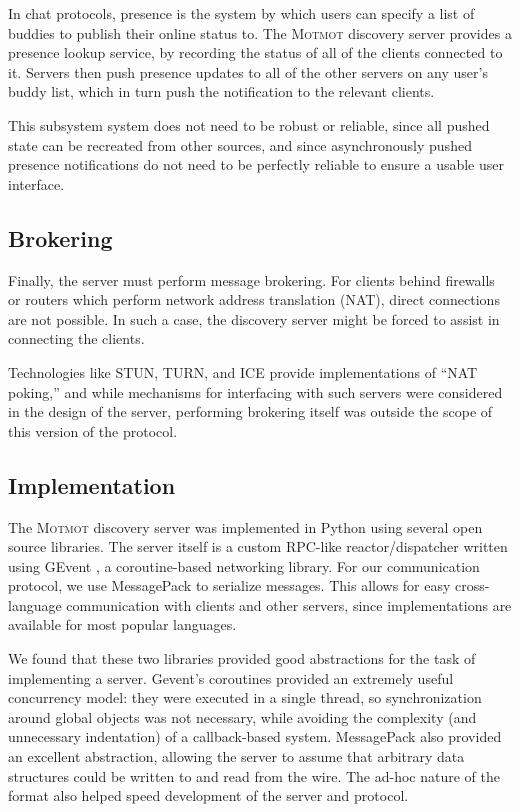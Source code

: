 \documentclass{sig-alternate}
\newcommand\Motmot{\textsc{Motmot}\xspace}
\begin{document}
In chat protocols, presence is the system by which users can specify a list of
buddies to publish their online status to. The \Motmot discovery server provides
a presence lookup service, by recording the status of all of the clients
connected to it. Servers then push presence updates to all of the other servers
on any user's buddy list, which in turn push the notification to the relevant
clients.

This subsystem system does not need to be robust or reliable, since all pushed
state can be recreated from other sources, and since asynchronously pushed
presence notifications do not need to be perfectly reliable to ensure a usable
user interface.

\subsection{Brokering}

Finally, the server must perform message brokering. For clients behind firewalls
or routers which perform network address translation (NAT), direct connections
are not possible. In such a case, the discovery server might be forced to assist
in connecting the clients.

Technologies like STUN, TURN, and ICE provide implementations of ``NAT poking,''
and while mechanisms for interfacing with such servers were considered in the
design of the server, performing brokering itself was outside the scope of this
version of the protocol.

\subsection{Implementation}

The \Motmot discovery server was implemented in Python using several open source
libraries. The server itself is a custom RPC-like reactor/dispatcher written
using GEvent \cite{glib}, a coroutine-based networking library. For our
communication protocol, we use MessagePack \cite{msgpack} to serialize messages.
This allows for easy cross-language communication with clients and other servers,
since implementations are available for most popular languages.

We found that these two libraries provided good abstractions for the task of
implementing a server. Gevent's coroutines provided an extremely useful
concurrency model: they were executed in a single thread, so synchronization
around global objects was not necessary, while avoiding the complexity (and
unnecessary indentation) of a callback-based system. MessagePack also provided
an excellent abstraction, allowing the server to assume that arbitrary data
structures could be written to and read from the wire. The ad-hoc nature of the
format also helped speed development of the server and protocol.
\end{document}

